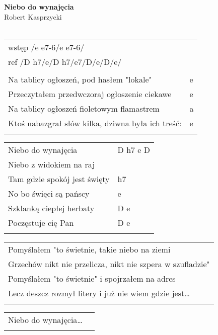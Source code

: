 \documentclass[a5paper]{article}
\begin{document}


\noindent
\fontsize{12pt}{15pt}\selectfont
\textbf{Niebo do wynajęcia} \\
\fontsize{8pt}{10pt}\selectfont
Robert Kasprzycki \\ \\
\fontsize{10pt}{12pt}\selectfont
{}
\begin{tabular}{@{}p{8.50cm}p{3cm}@{}}
\noindent
wstęp /e e7-6/e e7-6/  \\
ref /D h7/e/D h7/e7/D/e/D/e/ \\ \\

Na tablicy ogłoszeń, pod hasłem "lokale" & e \\
Przeczytałem przedwczoraj ogłoszenie ciekawe & e \\		
Na tablicy ogłoszeń fioletowym flamastrem & a  \\
Ktoś nabazgrał słów kilka, dziwna była ich treść: & e \\ \\
\end{tabular}

\noindent
\begin{tabular}{@{}p{7.50cm}p{3cm}@{}}
Niebo do wynajęcia & D h7 e D \\
Niebo z widokiem na raj	& \\
Tam gdzie spokój jest święty & h7 \\
No bo święci są pańscy & e \\
Szklanką ciepłej herbaty & D e \\
Poczęstuje cię Pan & D e \\ \\
\end{tabular}

\noindent
\begin{tabular}{@{}p{9.50cm}@{}}
Pomyślałem "to świetnie, takie niebo na ziemi \\
Grzechów nikt nie przelicza, nikt nie szpera w szufladzie" \\
Pomyślałem "to świetnie" i spojrzałem na adres \\
Lecz deszcz rozmył litery i już nie wiem gdzie jest… \\ \\
\end{tabular}

\noindent
\begin{tabular}{@{}p{7.50cm}p{3cm}@{}}
Niebo do wynajęcia… \\ \\
\end{tabular}
\end{document}
